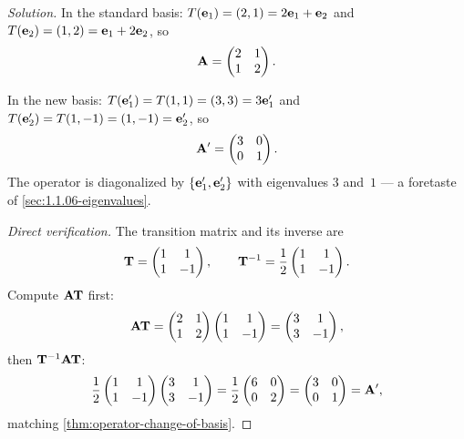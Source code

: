 \begin{proof}[Solution]
In the standard basis: $T(\mathbf{e}_1) = (2, 1) = 2\mathbf{e}_1 + \mathbf{e}_2$
and $T(\mathbf{e}_2) = (1, 2) = \mathbf{e}_1 + 2\mathbf{e}_2$, so
\[
  \mathbf{A} = \begin{pmatrix} 2 & 1 \\ 1 & 2 \end{pmatrix}.
\]

In the new basis: $T(\mathbf{e}'_1) = T(1, 1) = (3, 3) = 3\mathbf{e}'_1$ and
$T(\mathbf{e}'_2) = T(1, -1) = (1, -1) = \mathbf{e}'_2$, so
\[
  \mathbf{A}' = \begin{pmatrix} 3 & 0 \\ 0 & 1 \end{pmatrix}.
\]
The operator is diagonalized by $\{\mathbf{e}'_1, \mathbf{e}'_2\}$ with
eigenvalues $3$ and~$1$ — a foretaste of \cref{sec:1.1.06-eigenvalues}.

\emph{Direct verification.} The transition matrix and its inverse are
\[
  \mathbf{T} = \begin{pmatrix} 1 & 1 \\ 1 & -1 \end{pmatrix}, \qquad
  \mathbf{T}^{-1} = \frac{1}{2}\begin{pmatrix} 1 & 1 \\ 1 & -1 \end{pmatrix}.
\]
Compute $\mathbf{A}\mathbf{T}$ first:
\[
  \mathbf{A}\mathbf{T} = \begin{pmatrix} 2 & 1 \\ 1 & 2 \end{pmatrix}\begin{pmatrix} 1 & 1 \\ 1 & -1 \end{pmatrix}
  = \begin{pmatrix} 3 & 1 \\ 3 & -1 \end{pmatrix},
\]
then $\mathbf{T}^{-1}\mathbf{A}\mathbf{T}$:
\[
  \frac{1}{2}\begin{pmatrix} 1 & 1 \\ 1 & -1 \end{pmatrix}\begin{pmatrix} 3 & 1 \\ 3 & -1 \end{pmatrix}
  = \frac{1}{2}\begin{pmatrix} 6 & 0 \\ 0 & 2 \end{pmatrix}
  = \begin{pmatrix} 3 & 0 \\ 0 & 1 \end{pmatrix} = \mathbf{A}',
\]
matching \cref{thm:operator-change-of-basis}.
\end{proof}
